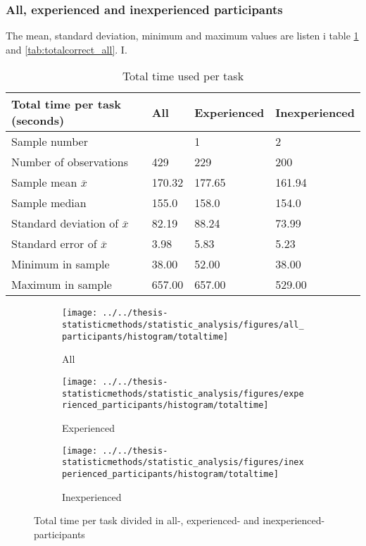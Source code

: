 
\subsubsection{All,  experienced and inexperienced participants}\label{sec:alltasks}

The mean, standard deviation, minimum and maximum values are listen i table \ref{tab:totaltime_all} and \ref{tab:totalcorrect_all}. I. 

\begin{table}[H]
	\centering
	\begin{tabular}{l|l|l|l}
		Total time per task (seconds)   & All  & Experienced & Inexperienced \\ \hline
		Sample number &   & 1  & 2   \\
		Number of observations & 429    & 229    & 200   \\
		Sample mean $\overline{x}$     & 170.32 & 177.65  & 161.94     \\
		Sample median  & 155.0 & 158.0  & 154.0  \\
		Standard deviation of $\overline{x}$  & 82.19  & 88.24  & 73.99   \\
		Standard error of $\overline{x}$  & 3.98  & 5.83 & 5.23  \\
		Minimum in sample & 38.00  & 52.00  & 38.00     \\
		Maximum in sample & 657.00 & 657.00  & 529.00    \\ \hline
	\end{tabular}
	\caption[All participants and all tasks]{Total time used per task}
	\label{tab:totaltime_all}
\end{table}

\begin{figure}[H]
	\centering
	\begin{subfigure}[b]{0.32\textwidth}
		\centering
		\texttt{[image: ../../thesis-statisticmethods/statistic\_analysis/figures/all\_participants/histogram/totaltime]}
		\caption{All}
		\label{fig:totaltime_all}
	\end{subfigure}
	\begin{subfigure}[b]{0.32\textwidth}
		\centering
		\texttt{[image: ../../thesis-statisticmethods/statistic\_analysis/figures/experienced\_participants/histogram/totaltime]}
		\caption{Experienced}
		\label{fig:totaltime_experienced}
	\end{subfigure}
	\begin{subfigure}[b]{0.32\textwidth}
		\centering
		\texttt{[image: ../../thesis-statisticmethods/statistic\_analysis/figures/inexperienced\_participants/histogram/totaltime]}
		\caption{Inexperienced}
		\label{fig:totaltime_inexperienced}
	\end{subfigure}
	\caption[Total time, participants sorted]{Total time per task divided in  all-, experienced- and inexperienced-participants}
\end{figure}

